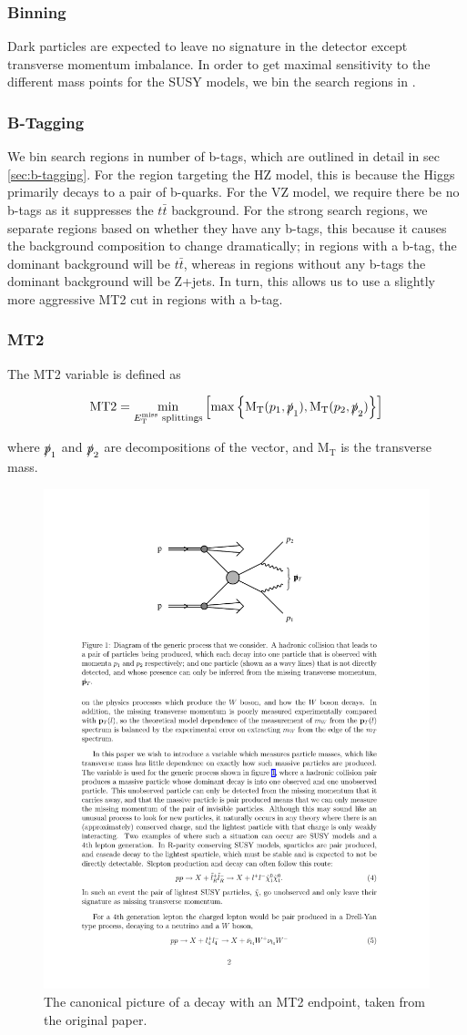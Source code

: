     \subsubsection{\MET Binning}

      Dark particles are expected to leave no signature in the detector except transverse momentum imbalance. In order to get maximal sensitivity to the different mass points for the SUSY models, we bin the search regions in \MET.

    \subsubsection{B-Tagging} \label{sec:b-tagging_selection}
      We bin search regions in number of b-tags, which are outlined in detail in sec \ref{sec:b-tagging}. For the region targeting the HZ model, this is because the Higgs primarily decays to a pair of b-quarks. For the VZ model, we require there be no b-tags as it suppresses the $t\bar{t}$ background. For the strong search regions, we separate regions based on whether they have any b-tags, this because it causes the background composition to change dramatically; in regions with a b-tag, the dominant background will be $t\bar{t}$, whereas in regions without any b-tags the dominant background will be Z+jets. In turn, this allows us to use a slightly more aggressive MT2 cut in regions with a b-tag.

    \subsubsection{MT2} \label{sec:MT2}
      The MT2 variable is defined as

      \[
      \text{MT2} = \min \limits_{\text{\MET splittings}} \left[ \max \left\{ \MT(p_1, \slashed{p}_1), \MT(p_2, \slashed{p}_2) \right\} \right]
      \]

      where $\slashed{p}_1$ and $\slashed{p}_2$ are decompositions of the \MET vector, and M$_{\text{T}}$ is the transverse mass. 

      \begin{figure}[h!]
        \centering
        \includegraphics[width=.5\textwidth]{figures/mt2_diagram.pdf}
        \caption{The canonical picture of a decay with an MT2 endpoint, taken from the original paper\cite{mt2_paper}. }
        \label{fig:MT2_feynman_diagram}
      \end{figure}

